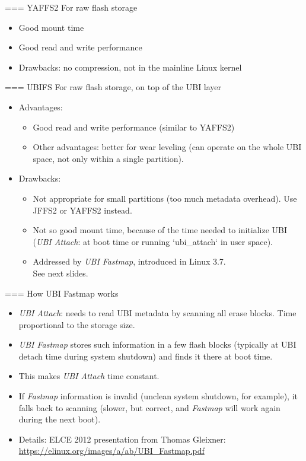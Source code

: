 === YAFFS2
For raw flash storage
\begin{itemize}
\item Good mount time
\item Good read and write performance
\item Drawbacks: no compression, not in the mainline Linux kernel
\end{itemize}


=== UBIFS
For raw flash storage, on top of the UBI layer
\begin{itemize}
\item Advantages:
      \begin{itemize}
      \item Good read and write performance (similar to YAFFS2)
      \item Other advantages: better for wear leveling (can operate on the
	    whole UBI space, not only within a single partition).
      \end{itemize}
\item Drawbacks:
      \begin{itemize}
      \item Not appropriate for small partitions (too much metadata
	    overhead). Use JFFS2 or YAFFS2 instead.
      \item Not so good mount time, because of the time needed
            to initialize UBI ({\em UBI Attach}: at boot time or running
            `ubi_attach` in user space).
      \item Addressed by {\em UBI Fastmap}, introduced in Linux 3.7. \\
            See next slides.
      \end{itemize}
\end{itemize}


=== How UBI Fastmap works
\begin{itemize}
\item {\em UBI Attach}: needs to read UBI metadata by
      scanning all erase blocks. Time proportional
      to the storage size.
\item {\em UBI Fastmap} stores such information in a few flash
      blocks (typically at UBI detach time during system
      shutdown) and finds it there at boot time.
\item This makes {\em UBI Attach} time constant.
\item If {\em Fastmap} information is invalid (unclean system
      shutdown, for example), it falls back to scanning
      (slower, but correct, and {\em Fastmap} will work again
      during the next boot).
\item Details: ELCE 2012 presentation from Thomas Gleixner:
      \url{https://elinux.org/images/a/ab/UBI_Fastmap.pdf}
\end{itemize}


